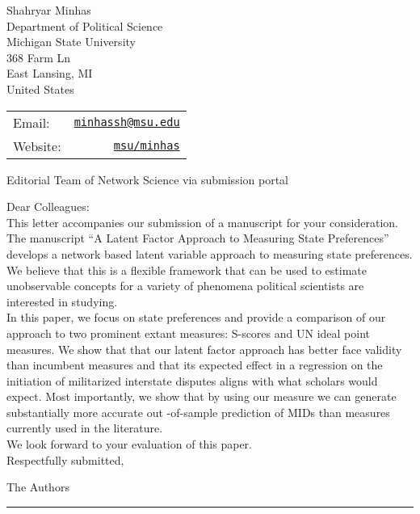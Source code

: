 \documentclass[letterpaper]{article}
\begin{document}
\thispagestyle{empty}

  
  
  \begin{minipage}{0.64\linewidth}
Shahryar Minhas \\
Department of Political Science \\
Michigan State University \\
368 Farm Ln \\
East Lansing, MI \\
United States
\end{minipage}
\begin{minipage}{0.45\linewidth}
  \begin{tabular}{lr}
    Email: & \href{mailto:minhassh@msu.edu}{\tt minhassh@msu.edu}  \\
    Website:& \href{https://s7minhas.com/}{\tt msu/minhas}
  \end{tabular}
\end{minipage}
  
\vspace{1.5in}

{Editorial Team of Network Science via submission portal}

\vspace{0.5in}

Dear Colleagues:\\[1ex]

This letter accompanies our submission of a manuscript for your consideration. The manuscript ``A Latent Factor Approach to Measuring State Preferences'' develops a network based latent variable approach to measuring state preferences. We believe that this is a flexible framework that can be used to estimate unobservable concepts for a variety of phenomena political scientists are interested in studying.  \\[1ex]

In this paper, we focus on state preferences and provide a comparison of our approach to two prominent extant measures: S-scores and UN ideal point measures. We show that that our latent factor approach has better face validity than incumbent measures and that its expected effect in a regression on the initiation of militarized interstate disputes aligns with what scholars would expect. Most importantly, we show that by using our measure we can generate substantially more accurate out -of-sample prediction of MIDs than measures currently used in the literature. \\[1ex]

We look forward to your evaluation of this paper.\\[1ex]

Respectfully submitted,

\vspace{.1in}

The Authors

\vskip 0.5in
\hrule
\end{document}
